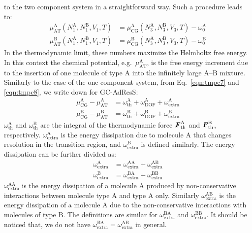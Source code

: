 \documentclass[a4paper,preprint,unsortedaddress]{revtex4-1}
\newcommand{\vect}[1]{\textbf{\textit{#1}}}
\newcommand{\dof}{{\textrm{DOF}}}
\newcommand{\AT}{{\textrm{{AT}}}}
\newcommand{\CG}{{\textrm{CG}}}
\newcommand{\thf}{{\textrm{th}}}
\newcommand{\ext}{{\textrm{extra}}}
\newcommand{\typea}{{\textrm{A}}}
\newcommand{\typeb}{{\textrm{B}}}
\begin{document}
{to the two component system in a straightforward way.
Such a procedure leads to:
\begin{align}\label{eqn:tmpc7}
  \mu^\typea_\AT(N^\typea_1, N^\typeb_1, V_1, T) &= \mu^\typea_\CG(N^\typea_3, N^\typeb_3, V_3, T) - \omega^\typea_0\\\label{eqn:tmpc8}
  \mu^\typeb_\AT(N^\typea_1, N^\typeb_1, V_1, T) &= \mu^\typeb_\CG(N^\typea_3, N^\typeb_3, V_3, T) - \omega^\typeb_0
\end{align}
In the thermodynamic limit, these numbers maximize the Helmholtz free energy.
In this context the chemical potential, e.g.~$\mu_\AT^\typea$, is the free energy increment due to the insertion of one molecule of type $\typea$ 
into the infinitely large $\typea$--$\typeb$ mixture.\\
Similarly to the case of the one component system, from Eq.~\eqref{eqn:tmpc7} and \eqref{eqn:tmpc8},
we write down  for GC-AdResS:
\begin{align}\label{eqn:mueq-d-a}
 \mu^\typea_\CG - \mu^\typea_\AT &=   \omega^\typea_\thf + \omega^\typea_\dof + \omega^\typea_\ext\\\label{eqn:mueq-d-b}
 \mu^\typeb_\CG - \mu^\typeb_\AT &=   \omega^\typeb_\thf + \omega^\typeb_\dof + \omega^\typeb_\ext
\end{align}
$ \omega^\typea_\thf$ and $ \omega^\typeb_\thf$ are 
the integral of the thermodynamic force $\vect F^\typea_\thf$ and
$\vect F^\typeb_\thf$, respectively. $\omega^\typea_\ext$ is the energy
dissipation due to molecule $\typea$ that
changes resolution in the transition region,
and  $\omega^\typeb_\ext$ is defined similarly.
The energy dissipation can be further divided as:
\begin{align}\label{eqn:wextra-split-a}
  \omega^\typea_\ext& = \omega^{\typea\typea}_\ext + \omega^{\typea\typeb}_\ext\\\label{eqn:wextra-split-b}
  \omega^\typeb_\ext& = \omega^{\typeb\typea}_\ext + \omega^{\typeb\typeb}_\ext
\end{align}
$ \omega^{\typea\typea}_\ext$ is the energy dissipation of a molecule
$\typea$ produced by  non-conservative interactions between
molecule type $\typea$ and type $\typea$ only.
Similarly $\omega^{\typea\typeb}_\ext$ is
the energy dissipation of a molecule $\typea$
due to the non-conservative interactions with molecules of type $\typeb$.  The definitions are similar for $
\omega^{\typeb\typea}_\ext$ and $ \omega^{\typeb\typeb}_\ext$.
It should be noticed that, we do not have
$\omega^{\typeb\typea}_\ext = \omega^{\typea\typeb}_\ext$ in general.
}
\end{document}
